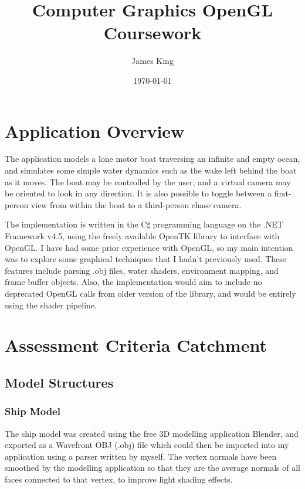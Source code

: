 \documentclass[a4paper,11pt]{article}
\title{Computer Graphics OpenGL Coursework}
\date{\today}
\author{James King}
\begin{document}
\maketitle

\section{Application Overview}
The application models a lone motor boat traversing an infinite and empty ocean, and simulates some simple water dynamics such as the wake left behind the boat as it moves. The boat may be controlled by the user, and a virtual camera may be oriented to look in any direction. It is also possible to toggle between a first-person view from within the boat to a third-person chase camera.

The implementation is written in the C$\sharp$ programming language on the .NET Framework v4.5, using the freely available OpenTK library to interface with OpenGL. I have had some prior experience with OpenGL, so my main intention was to explore some graphical techniques that I hadn't previously used. These features include parsing .obj files, water shaders, environment mapping, and frame buffer objects. Also, the implementation would aim to include no deprecated OpenGL calls from older version of the library, and would be entirely using the shader pipeline.

\section{Assessment Criteria Catchment}
\subsection{Model Structures}
\subsubsection{Ship Model}
The ship model was created using the free 3D modelling application Blender, and exported as a Wavefront OBJ (.obj) file which could then be imported into my application using a parser written by myself. The vertex normals have been smoothed by the modelling application so that they are the average normals of all faces connected to that vertex, to improve light shading effects.
\end{document}
